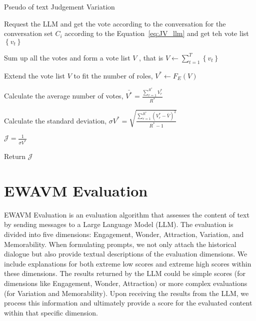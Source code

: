 \begin{algorithm*}[htbp]

    \renewcommand{\arraystretch}{1.3}
    \setlength{\tabcolsep}{10pt}
  
    \caption{Pseudo of text Judgement Variation }
  
    \label{alg:JudgementVariation}
    
     {
        Request the LLM and get the vote according to the conversation for the conversation set $  C_{i} $ according to the Equation~\ref{eq:JV_llm} and get teh vote list $\left\{ v_t \right\}$
    }

    Sum up all the votes and form a vote list $ V $ , that is $ V \leftarrow  \sum_{t=1}^{T}\left\{ v_{t} \right\} $
  
    Extend the vote list $ V $ to fit the number of roles,  $ V^* \leftarrow  F_E(V) $

    Calculate the average number of votes, $ \bar{V^*} = \frac{ \sum_{r=1}^{R^*}{V_r^*} }{R^*} $

    Calculate the standard deviation, $ \sigma V^* = \sqrt{\frac{\sum_{r=1}^{R^*}{(V_r^* - \bar{V})^2}}{R^*-1}} $

    $ \mathcal{J} = \frac{1}{\sigma V^*}$ 

    Return $ \mathcal{J} $  
  
\end{algorithm*}

\section{EWAVM Evaluation}

EWAVM Evaluation is an evaluation algorithm that assesses the content of text by sending messages to a Large Language Model (LLM). The evaluation is divided into five dimensions: Engagement, Wonder, Attraction, Variation, and Memorability. When formulating prompts, we not only attach the historical dialogue but also provide textual descriptions of the evaluation dimensions. We include explanations for both extreme low scores and extreme high scores within these dimensions. The results returned by the LLM could be simple scores (for dimensions like Engagement, Wonder, Attraction) or more complex evaluations (for Variation and Memorability). Upon receiving the results from the LLM, we process this information and ultimately provide a score for the evaluated content within that specific dimension.

